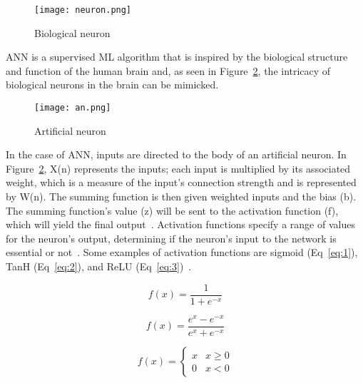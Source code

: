     \begin{figure}[htbp]
        \centering
        \texttt{[image: neuron.png]}
        \caption{Biological neuron~\cite{Deyoung1990ThinkingResearch}}
        \label{fig:neuron}
    \end{figure}
    
    \gls{ANN} is a supervised \gls{ML} algorithm that is inspired by the biological structure and function of the human brain and, as seen in Figure~\ref{fig:an}, the intricacy of biological neurons in the brain can be mimicked.
    
    \begin{figure}[htbp]
        \centering
        \texttt{[image: an.png]}
        \caption{Artificial neuron~\cite{Baheti12Choose}}
        \label{fig:an}
    \end{figure}
    
    In the case of \gls{ANN}, inputs are directed to the body of an artificial neuron. In Figure~\ref{fig:an}, X(n) represents the inputs; each input is multiplied by its associated weight, which is a measure of the input's connection strength and is represented by W(n). The summing function is then given weighted inputs and the bias (b). The summing function's value (z) will be sent to the activation function (f), which will yield the final output~\cite{Imran2019AClassification}. Activation functions specify a range of values for the neuron's output, determining if the neuron's input to the network is essential or not~\cite{2020ArtificialNetworks}. Some examples of activation functions are sigmoid (Eq~\ref{eq:1}), TanH (Eq~\ref{eq:2}), and ReLU (Eq~\ref{eq:3})~\cite{EnyinnaNwankpa2018ActivationLearning}.
    
    
    \begin{equation}\label{eq:1}
        f(x) = \frac{1}{1+e^{-x}}
    \end{equation}
    
    \begin{equation}\label{eq:2}
        f(x) = \frac{e^{x}-e^{-x}}{e^{x}+e^{-x}}
    \end{equation}
    
    \begin{equation} \label{eq:3}
        f(x) = \begin{cases}x & x \geq 0\\0 & x < 0\end{cases}
    \end{equation}
    
